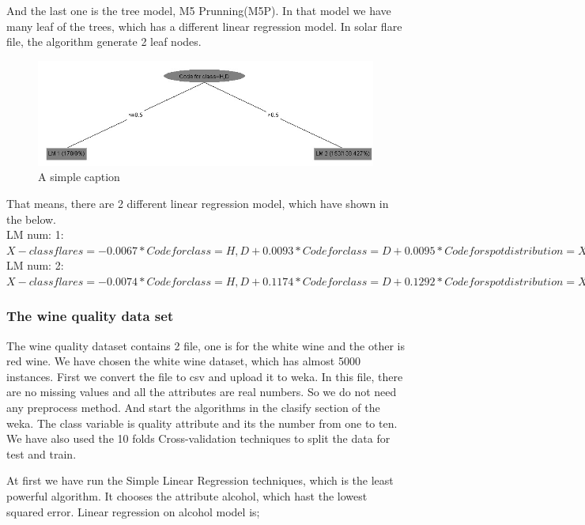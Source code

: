 \documentclass[a4paper]{article}
\begin{document}
And the last one is the tree model, M5 Prunning(M5P). In that model we have many leaf of the trees, which has a different linear regression model. In solar flare file, the algorithm generate 2 leaf nodes.

\begin{figure}[ht!]
\centering
\includegraphics[width=120mm]{tree}
\caption{A simple caption}
\label{overflow}
\end{figure}

That means, there are 2 different linear regression model, which have shown in the below.\\
LM num: 1: \\
$X-class flares = 
	-0.0067 * Code for class=H,D 
	+ 0.0093 * Code for class=D 
	+ 0.0095 * Code for spot distribution=X,C 
	+ 0.0022 * Historically-complex 
	- 0.0031$\\
LM num: 2:\\
$X-class flares= 
	-0.0074 * Code for class=H,D 
	+ 0.1174 * Code for class=D 
	+ 0.1292 * Code for spot distribution=X,C 
	+ 0.0552 * Historically-complex 
	- 0.1607$

\subsubsection{The wine quality data set}

The wine quality dataset contains 2 file, one is for the white wine and the other is red wine. We have chosen the white wine dataset, which has almost 5000 instances. First we convert the file to csv and upload it to weka. In this file, there are no missing values and all the attributes are real numbers. So we do not need any preprocess method. And start the algorithms in the clasify section of the weka. The class variable is quality attribute and its the number from one to ten. We have also used the 10 folds Cross-validation techniques to split the data for test and train. 

At first we have run the Simple Linear Regression techniques, which is the least powerful algorithm. It chooses the attribute alcohol, which hast the lowest squared error. Linear regression on alcohol model is; 
\end{document}
